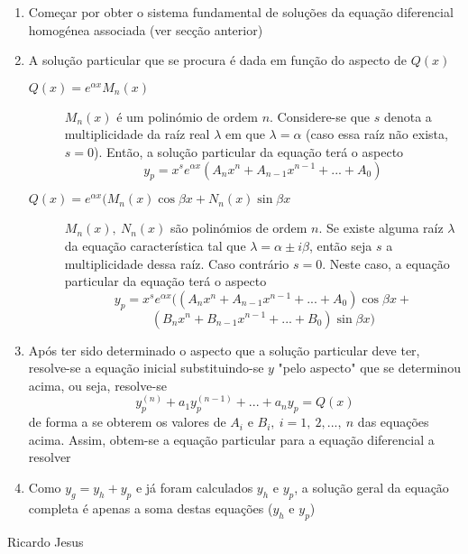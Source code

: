 \documentclass[10pt,landscape]{article}
\begin{document}
\begin{multicols}{3}
\begin{enumerate}
\item Começar por obter o sistema fundamental de soluções da equação diferencial homogénea associada (ver secção anterior)
\item A solução particular que se procura é dada em função do aspecto de $Q(x)$
\begin{description}
\item[$Q(x) = e^{\alpha x} M_n(x)$] $M_n(x)$ é um polinómio de ordem $n$. Considere-se que $s$ denota a multiplicidade da raíz real $\lambda$ em que $\lambda = \alpha$ (caso essa raíz não exista, $s = 0$). Então, a solução particular da equação terá o aspecto
$$y_p = x^s e^{\alpha x} (A_nx^n + A_{n-1}x^{n-1} + ... + A_0)$$
\item[$Q(x) = e^{\alpha x}(M_n(x)\cos{\beta x} + N_n(x)\sin{\beta x}$] $M_n(x),\ N_n(x)$ são polinómios de ordem $n$. Se existe alguma raíz $\lambda$ da equação característica tal que $\lambda = \alpha \pm i\beta$, então seja $s$ a multiplicidade dessa raíz. Caso contrário $s = 0$. Neste caso, a equação particular da equação terá o aspecto
$$y_p = x^s e^{\alpha x}((A_nx^n + A_{n-1}x^{n-1} + ... + A_0)\cos{\beta x} +$$
$$(B_nx^n + B_{n-1}x^{n-1} + ... + B_0)\sin{\beta x})$$
\end{description}
\item Após ter sido determinado o aspecto que a solução particular deve ter, resolve-se a equação inicial substituindo-se $y$ "pelo aspecto" que se determinou acima, ou seja, resolve-se
$$y_p^{(n)} + a_1 y_p^{(n-1)} + ... + a_n y_p = Q(x)$$
de forma a se obterem os valores de $A_i$ e $B_i,\ i = 1,\ 2, ...,\ n$ das equações acima. Assim, obtem-se a equação particular para a equação diferencial a resolver
\item Como $y_g = y_h + y_p$ e já foram calculados $y_h$ e $y_p$, a solução geral da equação completa é apenas a soma destas equações ($y_h$ e $y_p$)
\end{enumerate}

\vfill
\hfill Ricardo Jesus 
%

\end{multicols}
\end{document}
